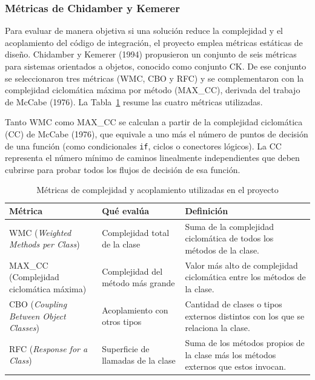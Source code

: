 \subsubsection{Métricas de Chidamber y Kemerer}
\label{sec:metricas-ck}
Para evaluar de manera objetiva si una solución reduce la complejidad y el acoplamiento del código de integración, el proyecto emplea métricas estáticas de diseño. Chidamber y Kemerer (1994) propusieron un conjunto de seis métricas para sistemas orientados a objetos, conocido como conjunto CK. De ese conjunto se seleccionaron tres métricas (WMC, CBO y RFC) y se complementaron con la complejidad ciclomática máxima por método (MAX\_CC), derivada del trabajo de McCabe (1976). La Tabla~\ref{tab:metricas-ck} resume las cuatro métricas utilizadas.

Tanto WMC como MAX\_CC se calculan a partir de la complejidad ciclomática (CC) de McCabe (1976), que equivale a uno más el número de puntos de decisión de una función (como condicionales \texttt{if}, ciclos o conectores lógicos). La CC representa el número mínimo de caminos linealmente independientes que deben cubrirse para probar todos los flujos de decisión de esa función.

\begin{table}[H]
  \centering
  \small
  \renewcommand{\arraystretch}{1.2}
  \begin{tabularx}{\textwidth}{|>{\raggedright\arraybackslash}p{3.4cm}|>{\raggedright\arraybackslash}p{4.2cm}|>{\raggedright\arraybackslash}X|}
    \hline
    \textbf{Métrica} & \textbf{Qué evalúa} & \textbf{Definición} \\ \hline
    WMC (\textit{Weighted Methods per Class}) & Complejidad total de la clase & Suma de la complejidad ciclomática de todos los métodos de la clase. \\ \hline
    MAX\_CC (Complejidad ciclomática máxima) & Complejidad del método más grande & Valor más alto de complejidad ciclomática entre los métodos de la clase. \\ \hline
    CBO (\textit{Coupling Between Object Classes}) & Acoplamiento con otros tipos & Cantidad de clases o tipos externos distintos con los que se relaciona la clase. \\ \hline
    RFC (\textit{Response for a Class}) & Superficie de llamadas de la clase & Suma de los métodos propios de la clase más los métodos externos que estos invocan. \\ \hline
  \end{tabularx}
  \caption{Métricas de complejidad y acoplamiento utilizadas en el proyecto}
  \label{tab:metricas-ck}
\end{table}

